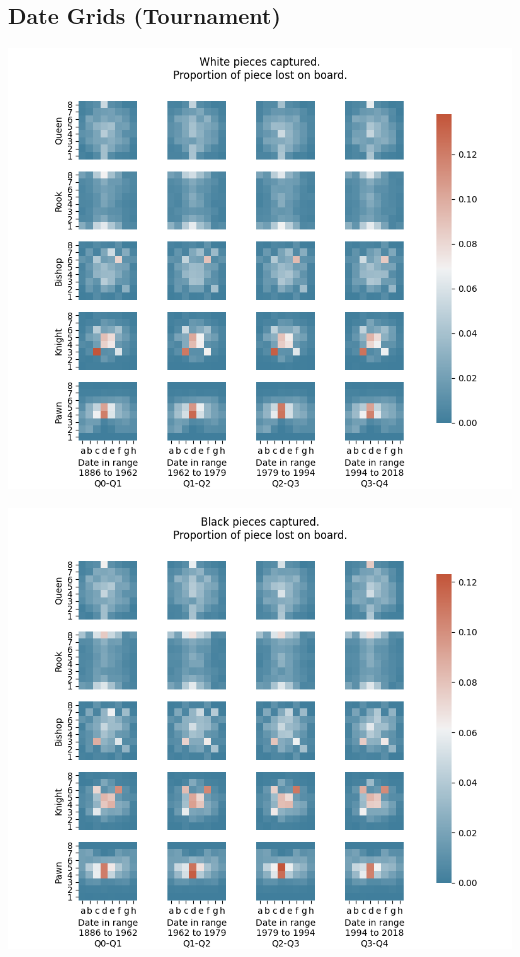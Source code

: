 \documentclass[11pt]{article}
\begin{document}
\subsection{Date Grids (Tournament)}
\label{sec:org9c8443e}
\begin{center}
\includegraphics[width=\textwidth]{Images/_HEATMAP_Queen_Rook_Bishop_Knight_Pawn_WHITE_DATE.png}
\end{center}

\begin{center}
\includegraphics[width=\textwidth]{Images/_HEATMAP_Queen_Rook_Bishop_Knight_Pawn_BLACK_DATE.png}
\end{center}
\end{document}
